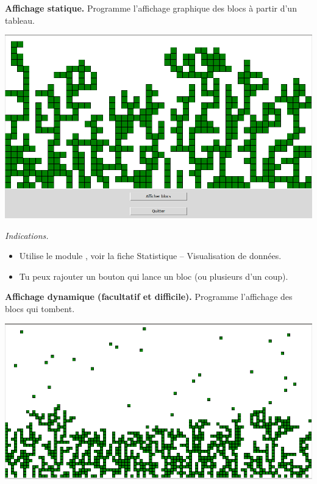 \documentclass[11pt,class=report,crop=false]{standalone}
\begin{document}
\begin{activite}


\textbf{Affichage statique.} Programme l'affichage graphique des blocs à partir d'un tableau.

\begin{center}
\includegraphics[scale=\myscale,scale=0.3]{ecran-alea-bloc1}
\end{center}
\medskip

\emph{Indications.}
\begin{itemize}
  \item Utilise le module , voir la fiche \og{}Statistique -- Visualisation de données\fg{}.
  \item Tu peux rajouter un bouton qui lance un bloc (ou plusieurs d'un coup). 
\end{itemize}

\medskip



\textbf{Affichage dynamique (facultatif et difficile).} Programme l'affichage des blocs qui tombent.
\medskip

\begin{center}
\includegraphics[scale=\myscale,scale=0.3]{ecran-alea-bloc2}
\end{center}


\end{activite}
\end{document}
